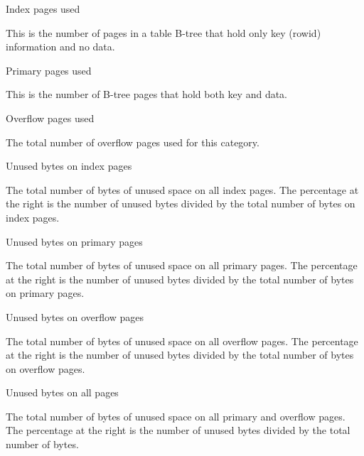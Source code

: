 Index pages used

    This is the number of pages in a table B-tree that hold only key (rowid)
    information and no data.

Primary pages used

    This is the number of B-tree pages that hold both key and data.

Overflow pages used

    The total number of overflow pages used for this category.

Unused bytes on index pages

    The total number of bytes of unused space on all index pages.  The
    percentage at the right is the number of unused bytes divided by the
    total number of bytes on index pages.

Unused bytes on primary pages

    The total number of bytes of unused space on all primary pages.  The
    percentage at the right is the number of unused bytes divided by the
    total number of bytes on primary pages.

Unused bytes on overflow pages

    The total number of bytes of unused space on all overflow pages.  The
    percentage at the right is the number of unused bytes divided by the
    total number of bytes on overflow pages.

Unused bytes on all pages

    The total number of bytes of unused space on all primary and overflow 
    pages.  The percentage at the right is the number of unused bytes 
    divided by the total number of bytes.

